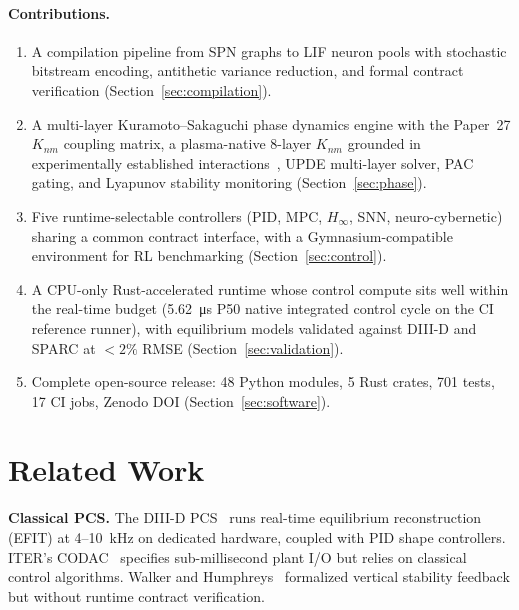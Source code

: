 \documentclass[twocolumn,preprintnumbers,amsmath,amssymb,prl,floatfix]{revtex4-2}
\begin{document}
\paragraph{Contributions.}
\begin{enumerate}
  \item A compilation pipeline from SPN graphs to LIF neuron pools
        with stochastic bitstream encoding, antithetic variance
        reduction, and formal contract verification
        (Section~\ref{sec:compilation}).
  \item A multi-layer Kuramoto--Sakaguchi phase dynamics engine with
        the Paper~27 $K_{nm}$ coupling matrix, a plasma-native
        8-layer $K_{nm}$ grounded in experimentally established
        interactions~\cite{diamond2005,terry2000,lahaye2006,porcelli1996},
        UPDE multi-layer solver, PAC gating, and Lyapunov stability
        monitoring (Section~\ref{sec:phase}).
  \item Five runtime-selectable controllers (PID, MPC, $H_\infty$,
        SNN, neuro-cybernetic) sharing a common contract interface,
        with a Gymnasium-compatible environment for RL benchmarking
        (Section~\ref{sec:control}).
  \item A CPU-only Rust-accelerated runtime whose control compute sits well
        within the real-time budget (\SI{5.62}{\micro\second} P50 native
        integrated control cycle on the CI reference runner), with equilibrium
        models validated against DIII-D and SPARC at $<2\%$ RMSE
        (Section~\ref{sec:validation}).
  \item Complete open-source release: 48 Python modules, 5 Rust
        crates, 701 tests, 17 CI jobs, Zenodo DOI
        (Section~\ref{sec:software}).
\end{enumerate}


\section{Related Work}
\label{sec:related}

\textbf{Classical PCS.}\quad
The DIII-D PCS~\cite{ferron1998} runs real-time equilibrium
reconstruction (EFIT) at 4--10~kHz on dedicated hardware, coupled with
PID shape controllers.  ITER's CODAC~\cite{iter_codac} specifies
sub-millisecond plant I/O but relies on classical control algorithms.
Walker and Humphreys~\cite{walker2020} formalized vertical stability
feedback but without runtime contract verification.
\end{document}
